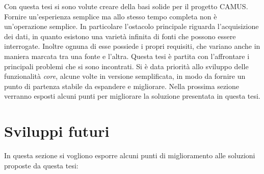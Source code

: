 Con questa tesi si sono volute creare della basi solide per il progetto CAMUS. Fornire un'esperienza semplice ma allo stesso tempo completa non è un'operazione semplice. In particolare l'ostacolo principale riguarda l'acquisizione dei dati, in quanto esistono una varietà infinita di fonti che possono essere interrogate. Inoltre ognuna di esse possiede i propri requisiti, che variano anche in maniera marcata tra una fonte e l'altra. Questa tesi è partita con l'affrontare i principali problemi che si sono incontrati. Si è data priorità allo sviluppo delle funzionalità \emph{core}, alcune volte in versione semplificata, in modo da fornire un punto di partenza stabile da espandere e migliorare. Nella prossima sezione verranno esposti alcuni punti per migliorare la soluzione presentata in questa tesi.

\section{Sviluppi futuri}

In questa sezione si vogliono esporre alcuni punti di miglioramento alle soluzioni proposte da questa tesi:

